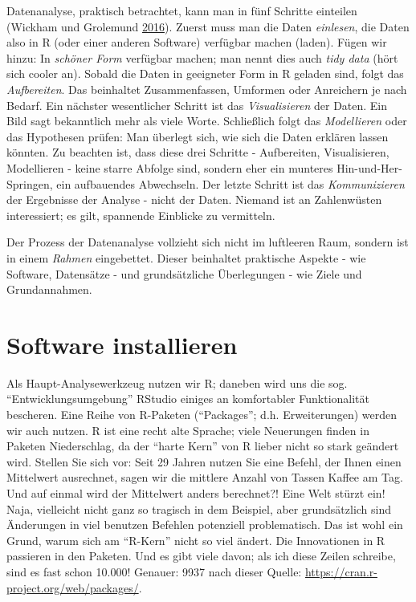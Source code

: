 \documentclass[12pt,ngerman,]{book}
\theoremstyle{definition}
\theoremstyle{definition}
\theoremstyle{remark}
\begin{document}
Datenanalyse, praktisch betrachtet, kann man in fünf Schritte einteilen
(Wickham und Grolemund \protect\hyperlink{ref-r4ds}{2016}). Zuerst muss
man die Daten \emph{einlesen}, die Daten also in R (oder einer anderen
Software) verfügbar machen (laden). Fügen wir hinzu: In \emph{schöner
Form} verfügbar machen; man nennt dies auch \emph{tidy data} (hört sich
cooler an). Sobald die Daten in geeigneter Form in R geladen sind, folgt
das \emph{Aufbereiten}. Das beinhaltet Zusammenfassen, Umformen oder
Anreichern je nach Bedarf. Ein nächster wesentlicher Schritt ist das
\emph{Visualisieren} der Daten. Ein Bild sagt bekanntlich mehr als viele
Worte. Schließlich folgt das \emph{Modellieren} oder das Hypothesen
prüfen: Man überlegt sich, wie sich die Daten erklären lassen könnten.
Zu beachten ist, dass diese drei Schritte - Aufbereiten, Visualisieren,
Modellieren - keine starre Abfolge sind, sondern eher ein munteres
Hin-und-Her-Springen, ein aufbauendes Abwechseln. Der letzte Schritt ist
das \emph{Kommunizieren} der Ergebnisse der Analyse - nicht der Daten.
Niemand ist an Zahlenwüsten interessiert; es gilt, spannende Einblicke
zu vermitteln.

Der Prozess der Datenanalyse vollzieht sich nicht im luftleeren Raum,
sondern ist in einem \emph{Rahmen} eingebettet. Dieser beinhaltet
praktische Aspekte - wie Software, Datensätze - und grundsätzliche
Überlegungen - wie Ziele und Grundannahmen.

\section{Software installieren}\label{software-installieren}

Als Haupt-Analysewerkzeug nutzen wir R; daneben wird uns die sog.
``Entwicklungsumgebung'' RStudio einiges an komfortabler Funktionalität
bescheren. Eine Reihe von R-Paketen (``Packages''; d.h. Erweiterungen)
werden wir auch nutzen. R ist eine recht alte Sprache; viele Neuerungen
finden in Paketen Niederschlag, da der ``harte Kern'' von R lieber nicht
so stark geändert wird. Stellen Sie sich vor: Seit 29 Jahren nutzen Sie
eine Befehl, der Ihnen einen Mittelwert ausrechnet, sagen wir die
mittlere Anzahl von Tassen Kaffee am Tag. Und auf einmal wird der
Mittelwert anders berechnet?! Eine Welt stürzt ein! Naja, vielleicht
nicht ganz so tragisch in dem Beispiel, aber grundsätzlich sind
Änderungen in viel benutzen Befehlen potenziell problematisch. Das ist
wohl ein Grund, warum sich am ``R-Kern'' nicht so viel ändert. Die
Innovationen in R passieren in den Paketen. Und es gibt viele davon; als
ich diese Zeilen schreibe, sind es fast schon 10.000! Genauer: 9937 nach
dieser Quelle: \url{https://cran.r-project.org/web/packages/}.
\end{document}
